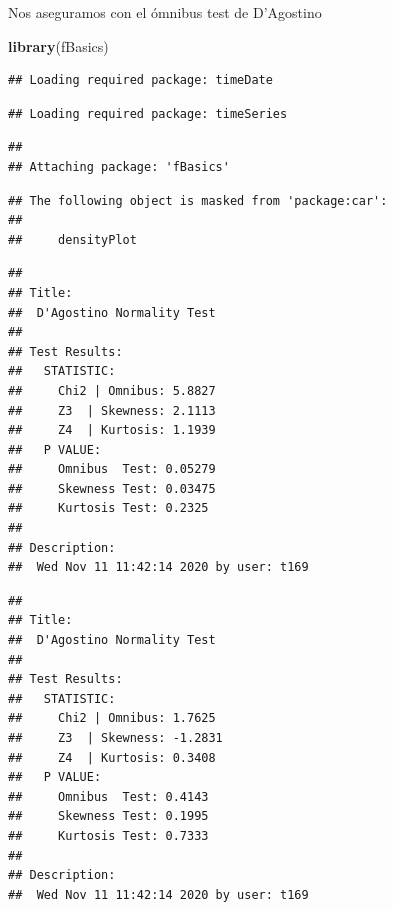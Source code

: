 \documentclass[
]{article}
\newenvironment{Shaded}{\begin{snugshade}}{\end{snugshade}}
\newcommand{\KeywordTok}[1]{\textcolor[rgb]{0.13,0.29,0.53}{\textbf{#1}}}
\newcommand{\NormalTok}[1]{#1}
\newcommand{\OperatorTok}[1]{\textcolor[rgb]{0.81,0.36,0.00}{\textbf{#1}}}
\newcommand{\StringTok}[1]{\textcolor[rgb]{0.31,0.60,0.02}{#1}}
\begin{document}
Nos aseguramos con el ómnibus test de D'Agostino

\begin{Shaded}
\begin{Highlighting}[]
\KeywordTok{library}\NormalTok{(fBasics)}
\end{Highlighting}
\end{Shaded}

\begin{verbatim}
## Loading required package: timeDate
\end{verbatim}

\begin{verbatim}
## Loading required package: timeSeries
\end{verbatim}

\begin{verbatim}
## 
## Attaching package: 'fBasics'
\end{verbatim}

\begin{verbatim}
## The following object is masked from 'package:car':
## 
##     densityPlot
\end{verbatim}

\begin{Shaded}
\end{Shaded}

\begin{verbatim}
## 
## Title:
##  D'Agostino Normality Test
## 
## Test Results:
##   STATISTIC:
##     Chi2 | Omnibus: 5.8827
##     Z3  | Skewness: 2.1113
##     Z4  | Kurtosis: 1.1939
##   P VALUE:
##     Omnibus  Test: 0.05279 
##     Skewness Test: 0.03475 
##     Kurtosis Test: 0.2325 
## 
## Description:
##  Wed Nov 11 11:42:14 2020 by user: t169
\end{verbatim}

\begin{Shaded}
\end{Shaded}

\begin{verbatim}
## 
## Title:
##  D'Agostino Normality Test
## 
## Test Results:
##   STATISTIC:
##     Chi2 | Omnibus: 1.7625
##     Z3  | Skewness: -1.2831
##     Z4  | Kurtosis: 0.3408
##   P VALUE:
##     Omnibus  Test: 0.4143 
##     Skewness Test: 0.1995 
##     Kurtosis Test: 0.7333 
## 
## Description:
##  Wed Nov 11 11:42:14 2020 by user: t169
\end{verbatim}
\end{document}
